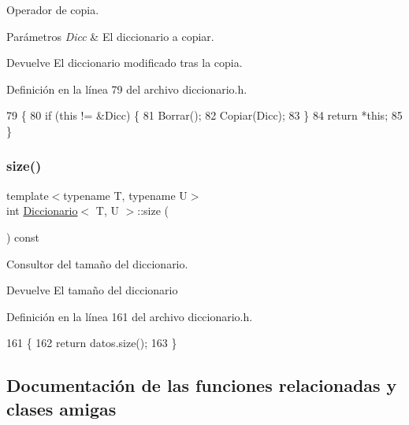 Operador de copia. 


\begin{DoxyParams}{Parámetros}
{\em Dicc} & El diccionario a copiar. \\
\hline
\end{DoxyParams}
\begin{DoxyReturn}{Devuelve}
El diccionario modificado tras la copia. 
\end{DoxyReturn}


Definición en la línea 79 del archivo diccionario.\+h.


\begin{DoxyCode}
79                                                                 \{
80         \textcolor{keywordflow}{if} (\textcolor{keyword}{this} != &Dicc) \{
81             Borrar();
82             Copiar(Dicc);
83         \}
84         \textcolor{keywordflow}{return} *\textcolor{keyword}{this};
85     \}
\end{DoxyCode}
\mbox{\label{classDiccionario_aa576b001759429fd58210ca57257d6f8}} 
\subsubsection{\texorpdfstring{size()}{size()}}
{\footnotesize\ttfamily template$<$typename T, typename U$>$ \\
int \hyperlink{classDiccionario}{Diccionario}$<$ T, U $>$\+::size (\begin{DoxyParamCaption}{ }\end{DoxyParamCaption}) const\hspace{0.3cm}{\ttfamily [inline]}}



Consultor del tamaño del diccionario. 

\begin{DoxyReturn}{Devuelve}
El tamaño del diccionario 
\end{DoxyReturn}


Definición en la línea 161 del archivo diccionario.\+h.


\begin{DoxyCode}
161                            \{
162         \textcolor{keywordflow}{return} datos.size();
163     \}
\end{DoxyCode}


\subsection{Documentación de las funciones relacionadas y clases amigas}
\mbox{\label{classDiccionario_a17e088cf1beb9832aaef7ecbbe2bd79a}} 
